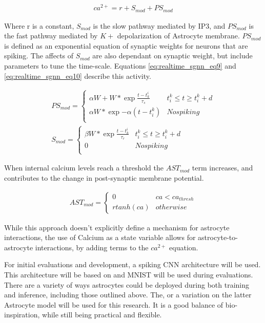     \begin{align}
        ca^{2+} = r + S_{mod} + PS_{mod}
    \end{align}
    
    Where r is a constant, $S_{mod}$ is the slow pathway mediated by IP3, and
    $PS_{mod}$ is the fast pathway mediated by $K+$ depolarization of Astrocyte
    membrane. $PS_{mod}$ is defined as an exponential equation of synaptic
    weights for neurons that are spiking. The affects of $S_{mod}$ are also
    dependant on synaptic weight, but include parameters to tune the
    time-scale. Equations \ref{eq:realtime_sgnn_eq9} and
    \ref{eq:realtime_sgnn_eq10} describe this activity.
    
    \begin{align}
        PS_{mod} =
        \begin{cases} 
            \alpha W + W * \exp{\frac{t-t^i_k}{\tau_s}} & t_i^k \leq t \geq
            t_i^k + d \\ \alpha W * \exp{-\alpha(t - t_i^k)} & No spiking\\
        \end{cases} \label{eq:realtime_sgnn_eq9} \\
        S_{mod} =
        \begin{cases} 
            \beta W * \exp{\frac{t-t^i_k}{\tau_r}} & t_i^k \leq t \geq t_i^k + d
            \\ 0 & No spiking\\
        \end{cases} \label{eq:realtime_sgnn_eq10}
    \end{align}
    
    
    When internal calcium levels reach a threshold the $AST_{mod}$ term
    increases, and contributes to the change in post-synaptic membrane
    potential.
    
    \begin{align}
        AST_{mod} =
        \begin{cases} 
            0 & ca < ca_{thresh} \\ r tanh(ca) & otherwise
        \end{cases}
    \end{align}
    
    While this approach doesn't explicitly define a mechanism for astrocyte
    interactions, the use of Calcium as a state variable allows for
    astrocyte-to-astrocyte interactions, by adding terms to the $ca^{2+}$
    equation.
    
    For initial evaluations and development, a spiking CNN architecture will be
    used. This architecture will be based on \cite{rstdp_mnist} and MNIST will
    be used during evaluations. There are a variety of ways astrocytes could be
    deployed during both training and inference, including those outlined
    above. The, or a variation on the latter Astrocyte model will be used for
    this research. It is a good balance of bio-inspiration, while still being
    practical and flexible.
    
